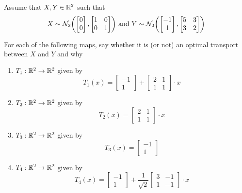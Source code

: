 \begin{problem}
	Assume that $X, Y \in \mathbb{R}^2$ such that
	$$
		X \sim \mc{N}_2 \tuple*{\begin{bmatrix}
			0 \\
			0
		\end{bmatrix}, \begin{bmatrix}
			1 & 0 \\
			0 & 1 
	\end{bmatrix}} \text{ and } 
	Y \sim \mc{N}_2 \tuple*{\begin{bmatrix}
			-1 \\
			1
		\end{bmatrix}, \begin{bmatrix}
			5 & 3 \\
			3 & 2 
	\end{bmatrix}}
	$$
	
	For each of the following maps, say whether it is (or not) an optimal transport between $X$ and $Y$ and why
	\begin{enumerate}[label=(\alph*)]
		\item $T_1: \mathbb{R}^2 \to \mathbb{R}^2$ given by
		$$
			T_1(x) = \begin{bmatrix}
				-1 \\
				1
			\end{bmatrix} + \begin{bmatrix}
				2 & 1 \\
				1 & 1
			\end{bmatrix} \cdot x
		$$
		
		\item $T_2: \mathbb{R}^2 \to \mathbb{R}^2$ given by
		$$
		T_2(x) =\begin{bmatrix}
			2 & 1 \\
			1 & 1
		\end{bmatrix} \cdot x
		$$
		
		\item $T_3: \mathbb{R}^2 \to \mathbb{R}^2$ given by
		$$
		T_3(x) = \begin{bmatrix}
			-1 \\
			1
		\end{bmatrix}
		$$
		
		\item $T_4: \mathbb{R}^2 \to \mathbb{R}^2$ given by
		$$
		T_4(x) = \begin{bmatrix}
			-1 \\
			1
		\end{bmatrix} + \frac{1}{\sqrt{2}}\begin{bmatrix}
			3 & -1 \\
			1 & -1
		\end{bmatrix} \cdot x
		$$
	\end{enumerate}
\end{problem}

